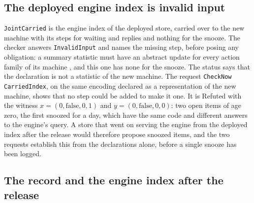 \documentclass[11pt]{article}
\newcommand{\code}[1]{\texttt{#1}}
\theoremstyle{definition}
\theoremstyle{plain}
\begin{document}
\subsection{The deployed engine index is invalid input}\label{sec:invalid}

\code{JointCarried} is the engine index of the deployed store, carried over to the new machine
with its steps for waiting and replies and nothing for the snooze. The checker answers
\code{InvalidInput} and names the missing step, before posing any obligation: a summary statistic
must have an abstract update for every action family of its machine \cite[Definition~3.1]{part2},
and this one has none for the snooze. The status says that the declaration is not a statistic of
the new machine. The request \code{CheckNow CarriedIndex}, on the same encoding declared as a
representation of the new machine, shows that no step could be added to make it one. It is Refuted
with the witness $x=(0,\mathrm{false},0,1)$ and $y=(0,\mathrm{false},0,0)$: two open items of age
zero, the first snoozed for a day, which have the same code and different answers to the engine's
query. A store that went on serving the engine from the deployed index after the release would
therefore propose snoozed items, and the two requests establish this from the declarations alone,
before a single snooze has been logged.

\subsection{The record and the engine index after the release}\label{sec:jointS}
\end{document}

